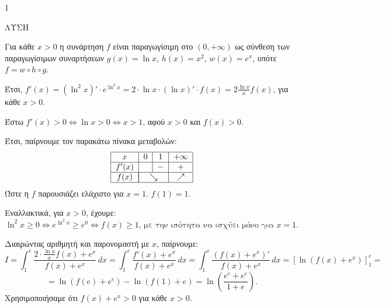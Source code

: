 \begin{ylh}{1}
    \item [Λύση]
\end{ylh}
ΛΥΣΗ
\begin{alist}
    \item Για κάθε $x > 0$ η συνάρτηση $f$ είναι παραγωγίσιμη στο $(0, +\infty)$ ως σύνθεση των παραγωγίσιμων συναρτήσεων $g(x) = \ln x$, $h(x) = x^2$, $w(x) = e^x$, οπότε $f = w \circ h \circ g$.

    Έτσι, $f'(x) = (\ln^2 x)' \cdot e^{\ln^2 x} = 2 \cdot \ln x \cdot (\ln x)' \cdot f(x) = 2 \frac{\ln x}{x} f(x)$, για κάθε $x > 0$.

    \item Έστω $f'(x) > 0 \Leftrightarrow \ln x > 0 \Leftrightarrow x > 1$, αφού $x > 0$ και $f(x) > 0$.

    Έτσι, παίρνουμε τον παρακάτω πίνακα μεταβολών:
    \[
    \begin{tabular}{|c|c|c|c|}
        \hline
        $x$ & $0$ & $1$ & $+\infty$ \\
        \hline
        $f'(x)$ & & $-$ & $+$ \\
        \hline
        $f(x)$ & \multicolumn{2}{|c|}{$\searrow$} & $\nearrow$ \\
        \hline
    \end{tabular}
    \]
    Ώστε η $f$ παρουσιάζει ελάχιστο για $x = 1$. \quad $f(1) = 1$.

    Εναλλακτικά, για $x>0$, έχουμε:
    \[ \ln^2 x \ge 0 \Leftrightarrow e^{\ln^2 x} \ge e^0 \Leftrightarrow f(x) \ge 1 \text{, με την ισότητα να ισχύει μόνο για } x=1. \]

    \item Διαιρώντας αριθμητή και παρονομαστή με $x$, παίρνουμε:
    \[ I = \int_1^e \frac{2 \cdot \frac{\ln x}{x} f(x) + e^x}{f(x)+e^x} \, dx = \int_1^e \frac{f'(x)+e^x}{f(x)+e^x} \, dx = \int_1^e \frac{(f(x)+e^x)'}{f(x)+e^x} \, dx = [\ln(f(x)+e^x)]_1^e = \]
    \[ = \ln(f(e) + e^e) - \ln(f(1) + e) = \ln \left( \frac{e^e+e^e}{1+e} \right). \]
    Χρησιμοποιήσαμε ότι $f(x) + e^x > 0$ για κάθε $x > 0$.
\end{alist}